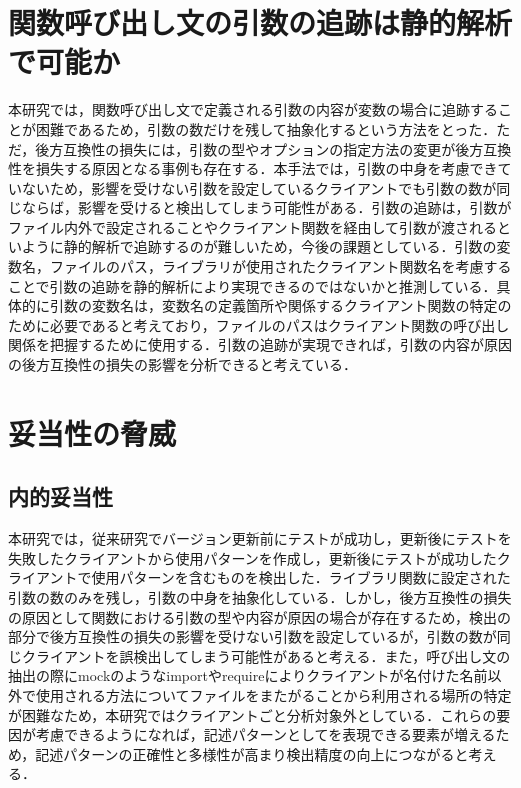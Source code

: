\documentclass[11pt]{jreport}
\begin{document}
\section{関数呼び出し文の引数の追跡は静的解析で可能か}

本研究では，関数呼び出し文で定義される引数の内容が変数の場合に追跡することが困難であるため，引数の数だけを残して抽象化するという方法をとった．ただ，後方互換性の損失には，引数の型やオプションの指定方法の変更が後方互換性を損失する原因となる事例も存在する．本手法では，引数の中身を考慮できていないため，影響を受けない引数を設定しているクライアントでも引数の数が同じならば，影響を受けると検出してしまう可能性がある．引数の追跡は，引数がファイル内外で設定されることやクライアント関数を経由して引数が渡されるといように静的解析で追跡するのが難しいため，今後の課題としている．引数の変数名，ファイルのパス，ライブラリが使用されたクライアント関数名を考慮することで引数の追跡を静的解析により実現できるのではないかと推測している．具体的に引数の変数名は，変数名の定義箇所や関係するクライアント関数の特定のために必要であると考えており，ファイルのパスはクライアント関数の呼び出し関係を把握するために使用する．引数の追跡が実現できれば，引数の内容が原因の後方互換性の損失の影響を分析できると考えている．

\section{妥当性の脅威}
\subsection{内的妥当性}
本研究では，従来研究でバージョン更新前にテストが成功し，更新後にテストを失敗したクライアントから使用パターンを作成し，更新後にテストが成功したクライアントで使用パターンを含むものを検出した．ライブラリ関数に設定された引数の数のみを残し，引数の中身を抽象化している．しかし，後方互換性の損失の原因として関数における引数の型や内容が原因の場合が存在するため，検出の部分で後方互換性の損失の影響を受けない引数を設定しているが，引数の数が同じクライアントを誤検出してしまう可能性があると考える．また，呼び出し文の抽出の際にmockのようなimportやrequireによりクライアントが名付けた名前以外で使用される方法についてファイルをまたがることから利用される場所の特定が困難なため，本研究ではクライアントごと分析対象外としている．これらの要因が考慮できるようになれば，記述パターンとしてを表現できる要素が増えるため，記述パターンの正確性と多様性が高まり検出精度の向上につながると考える．
\end{document}
